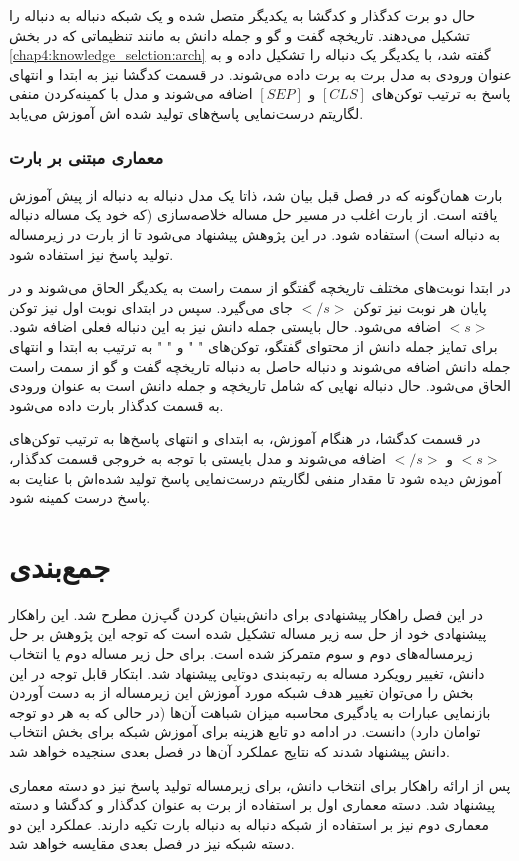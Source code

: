 حال دو برت کدگذار و کدگشا به یکدیگر متصل شده و یک شبکه دنباله به دنباله را تشکیل می‌دهند. تاریخچه گفت و گو و جمله دانش به مانند تنظیماتی که در 
بخش 
\ref{chap4:knowledge_selction:arch}
گفته شد، با یکدیگر یک دنباله را تشکیل داده و به عنوان ورودی به مدل برت به برت داده می‌شوند. در قسمت کدگشا نیز به ابتدا و انتهای پاسخ به ترتیب توکن‌های
$[CLS]$
و
$[SEP]$
اضافه می‌شوند و مدل با کمینه‌کردن منفی لگاریتم درست‌نمایی پاسخ‌های تولید شده اش  آموزش می‌یابد.  

\subsubsection{معماری مبتنی بر بارت} \label{chap4:generation:bart}

بارت همان‌گونه که در فصل قبل بیان شد، ذاتا یک مدل دنباله به دنباله از پیش آموزش یافته است. از بارت اغلب در مسیر حل مساله خلاصه‌سازی (که خود یک مساله دنباله به دنباله است) استفاده شود. در این پژوهش پیشنهاد می‌شود تا از بارت در زیرمساله تولید پاسخ نیز استفاده شود. 

در ابتدا نوبت‌های مختلف تاریخچه گفتگو از سمت راست به یکدیگر الحاق می‌شوند و در پایان هر نوبت نیز توکن
$</s>$
جای می‌گیرد. سپس در ابتدای نوبت اول نیز توکن
$<s>$
اضافه می‌شود. حال بایستی جمله دانش نیز به این دنباله فعلی اضافه شود. برای تمایز جمله دانش از محتوای گفتگو، توکن‌های 
"  "
و
" \lr{\textasciitilde} "
به ترتیب به ابتدا و انتهای جمله دانش اضافه می‌شوند و دنباله حاصل به دنباله تاریخچه گفت و گو از سمت راست الحاق می‌شود. حال دنباله نهایی که شامل تاریخچه و جمله دانش است به عنوان ورودی به قسمت کدگذار بارت داده می‌شود. 

در قسمت کدگشا، در هنگام آموزش، به ابتدای و انتهای پاسخ‌ها به ترتیب توکن‌های 
$<s>$
و
$</s>$
اضافه می‌شوند و مدل بایستی با توجه به خروجی قسمت کدگذار، آموزش دیده شود تا مقدار منفی لگاریتم درست‌نمایی پاسخ‌ تولید شده‌اش با عنایت به پاسخ درست کمینه شود.

\section{جمع‌بندی}
در این فصل راهکار پیشنهادی برای دانش‌بنیان کردن گپ‌زن مطرح شد. این راهکار پیشنهادی خود از حل سه زیر مساله تشکیل شده است که توجه این پژوهش بر حل زیرمساله‌های دوم و سوم متمرکز شده است. برای حل زیر مساله دوم یا انتخاب دانش، تغییر رویکرد مساله به رتبه‌بندی دوتایی پیشنهاد شد. ابتکار قابل توجه در این بخش را می‌توان تغییر هدف شبکه مورد آموزش این زیرمساله از به دست آوردن بازنمایی عبارات به یادگیری محاسبه میزان شباهت آن‌ها (در حالی که به هر دو توجه توامان دارد) دانست. در ادامه دو تابع هزینه برای آموزش شبکه برای بخش انتخاب دانش پیشنهاد شدند که نتایج عملکرد آن‌ها در فصل بعدی سنجیده خواهد شد.

پس از ارائه راهکار برای انتخاب دانش، برای زیرمساله تولید پاسخ نیز دو دسته معماری پیشنهاد شد. دسته‌ معماری اول بر استفاده از برت به عنوان کدگذار و کدگشا و دسته معماری دوم نیز بر استفاده از شبکه دنباله به دنباله بارت تکیه دارند. عملکرد این دو دسته شبکه نیز در فصل بعدی مقایسه خواهد شد. 

